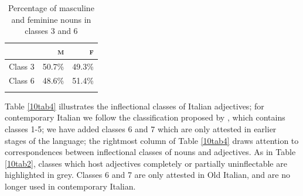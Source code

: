 \documentclass[output=paper,colorlinks,citecolor=brown]{langscibook}
\begin{document}
\begin{table}[ht]
	\centering
	\begin{tabularx}{0.4\textwidth}{Xrr}
		\lsptoprule
			& \textsc{m} & \textsc{f} \\
			\midrule
			Class 3 & 50.7\% & 49.3\% \\
			Class 6 & 48.6\% & 51.4\% \\
		\lspbottomrule
	\end{tabularx}
	\caption{Percentage of masculine and feminine nouns in \\ classes 3 and 6}
	\label{10tab3}
\end{table}

Table \ref{10tab4} illustrates the inflectional classes of Italian adjectives; for contemporary Italian we follow the classification proposed by \citet{iacobinithornton2016}, which contains classes 1-5; we have added classes 6 and 7 which are only attested in earlier stages of the language; the rightmost column of Table \ref{10tab4} draws attention to correspondences between inflectional classes of nouns and adjectives. As in Table \ref{10tab2}, classes which host adjectives completely or partially uninflectable are highlighted in grey. Classes 6 and 7 are only attested in Old Italian, and are no longer used in contemporary Italian.
\end{document}
